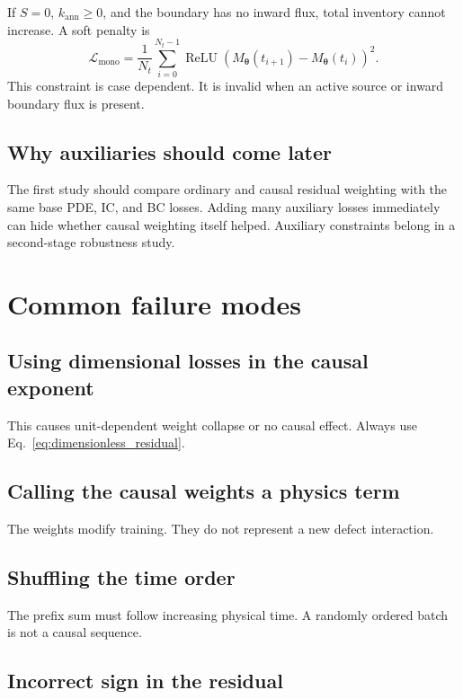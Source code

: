 \documentclass[11pt]{article}
\newcommand{\thetav}{\bm{\theta}}
\newcommand{\relu}{\operatorname{ReLU}}
\begin{document}
If $S=0$, $k_{\mathrm{ann}}\ge0$, and the boundary has no inward flux, total inventory cannot increase. A soft penalty is
\begin{equation}
\mathcal{L}_{\mathrm{mono}}
=
\frac{1}{N_t}
\sum_{i=0}^{N_t-1}
\relu\left(
M_{\thetav}(t_{i+1})-M_{\thetav}(t_i)
\right)^2.
\end{equation}
This constraint is case dependent. It is invalid when an active source or inward boundary flux is present.

\subsection{Why auxiliaries should come later}

The first study should compare ordinary and causal residual weighting with the same base PDE, IC, and BC losses. Adding many auxiliary losses immediately can hide whether causal weighting itself helped. Auxiliary constraints belong in a second-stage robustness study.

\section{Common failure modes}

\subsection{Using dimensional losses in the causal exponent}

This causes unit-dependent weight collapse or no causal effect. Always use Eq.~\eqref{eq:dimensionless_residual}.

\subsection{Calling the causal weights a physics term}

The weights modify training. They do not represent a new defect interaction.

\subsection{Shuffling the time order}

The prefix sum must follow increasing physical time. A randomly ordered batch is not a causal sequence.

\subsection{Incorrect sign in the residual}
\end{document}

